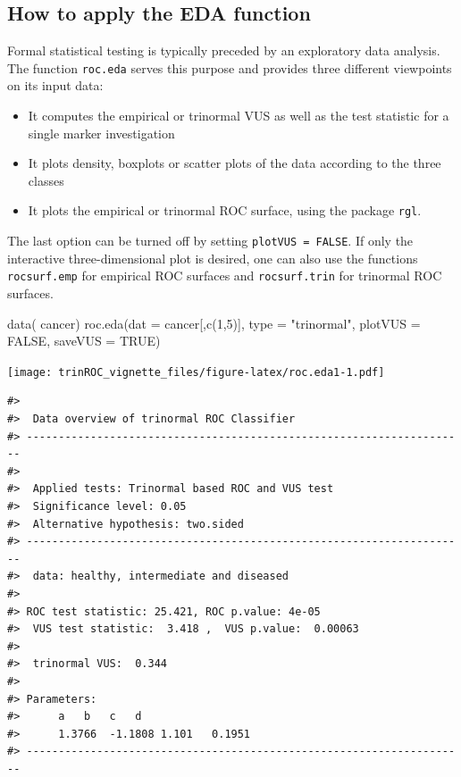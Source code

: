 \documentclass[
]{article}
\newenvironment{Shaded}{\begin{snugshade}}{\end{snugshade}}
\newcommand{\AttributeTok}[1]{\textcolor[rgb]{0.77,0.63,0.00}{#1}}
\newcommand{\ConstantTok}[1]{\textcolor[rgb]{0.00,0.00,0.00}{#1}}
\newcommand{\DecValTok}[1]{\textcolor[rgb]{0.00,0.00,0.81}{#1}}
\newcommand{\FunctionTok}[1]{\textcolor[rgb]{0.00,0.00,0.00}{#1}}
\newcommand{\NormalTok}[1]{#1}
\newcommand{\StringTok}[1]{\textcolor[rgb]{0.31,0.60,0.02}{#1}}
\providecommand{\tightlist}{%
  \setlength{\itemsep}{0pt}\setlength{\parskip}{0pt}}
\begin{document}
\hypertarget{how-to-apply-the-eda-function}{%
\subsection{How to apply the EDA
function}\label{how-to-apply-the-eda-function}}

Formal statistical testing is typically preceded by an exploratory data
analysis. The function \texttt{roc.eda} serves this purpose and provides
three different viewpoints on its input data:

\begin{itemize}
\tightlist
\item
  It computes the empirical or trinormal VUS as well as the test
  statistic for a single marker investigation
\item
  It plots density, boxplots or scatter plots of the data according to
  the three classes
\item
  It plots the empirical or trinormal ROC surface, using the package
  \texttt{rgl}.
\end{itemize}

The last option can be turned off by setting \texttt{plotVUS\ =\ FALSE}.
If only the interactive three-dimensional plot is desired, one can also
use the functions \texttt{rocsurf.emp} for empirical ROC surfaces and
\texttt{rocsurf.trin} for trinormal ROC surfaces.

\begin{Shaded}
\begin{Highlighting}[]
\FunctionTok{data}\NormalTok{( cancer)}
\FunctionTok{roc.eda}\NormalTok{(}\AttributeTok{dat =}\NormalTok{ cancer[,}\FunctionTok{c}\NormalTok{(}\DecValTok{1}\NormalTok{,}\DecValTok{5}\NormalTok{)], }\AttributeTok{type =} \StringTok{"trinormal"}\NormalTok{, }\AttributeTok{plotVUS =} \ConstantTok{FALSE}\NormalTok{, }\AttributeTok{saveVUS =} \ConstantTok{TRUE}\NormalTok{)}
\end{Highlighting}
\end{Shaded}

\texttt{[image: trinROC\_vignette\_files/figure-latex/roc.eda1-1.pdf]}

\begin{verbatim}
#> 
#>  Data overview of trinormal ROC Classifier 
#> --------------------------------------------------------------------- 
#> 
#>  Applied tests: Trinormal based ROC and VUS test 
#>  Significance level: 0.05
#>  Alternative hypothesis: two.sided
#> --------------------------------------------------------------------- 
#>  data: healthy, intermediate and diseased
#> 
#> ROC test statistic: 25.421, ROC p.value: 4e-05
#>  VUS test statistic:  3.418 ,  VUS p.value:  0.00063 
#> 
#>  trinormal VUS:  0.344 
#> 
#> Parameters: 
#>      a   b   c   d   
#>      1.3766  -1.1808 1.101   0.1951  
#> ---------------------------------------------------------------------
\end{verbatim}
\end{document}
